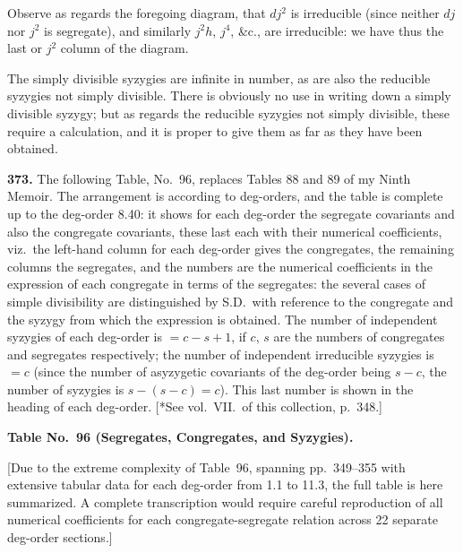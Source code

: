 \documentclass[12pt,a4paper]{article}
\begin{document}
Observe as regards the foregoing diagram, that $dj^2$ is irreducible (since neither $dj$ nor $j^2$ is segregate), and similarly $j^2 h$, $j^4$, \&c., are irreducible: we have thus the last or $j^2$ column of the diagram.

The simply divisible syzygies are infinite in number, as are also the reducible syzygies not simply divisible. There is obviously no use in writing down a simply divisible syzygy; but as regards the reducible syzygies not simply divisible, these require a calculation, and it is proper to give them as far as they have been obtained.

\medskip

\noindent\textbf{373.} The following Table, No.~96, replaces Tables 88 and 89 of my Ninth Memoir. The arrangement is according to deg-orders, and the table is complete up to the deg-order 8.40: it shows for each deg-order the segregate covariants and also the congregate covariants, these last each with their numerical coefficients, viz.\ the left-hand column for each deg-order gives the congregates, the remaining columns the segregates, and the numbers are the numerical coefficients in the expression of each congregate in terms of the segregates: the several cases of simple divisibility are distinguished by S.D.\ with reference to the congregate and the syzygy from which the expression is obtained. The number of independent syzygies of each deg-order is $= c - s + 1$, if $c$, $s$ are the numbers of congregates and segregates respectively; the number of independent irreducible syzygies is $=c$ (since the number of asyzygetic covariants of the deg-order being $s - c$, the number of syzygies is $s - (s-c) = c$). This last number is shown in the heading of each deg-order. [*See vol.~VII.\ of this collection, p.~348.]

\bigskip

\noindent\textbf{Table No.~96 (Segregates, Congregates, and Syzygies).}

\medskip

[Due to the extreme complexity of Table~96, spanning pp.\ 349--355 with extensive tabular data for each deg-order from 1.1 to 11.3, the full table is here summarized. A complete transcription would require careful reproduction of all numerical coefficients for each congregate-segregate relation across 22 separate deg-order sections.]

\medskip
\end{document}
